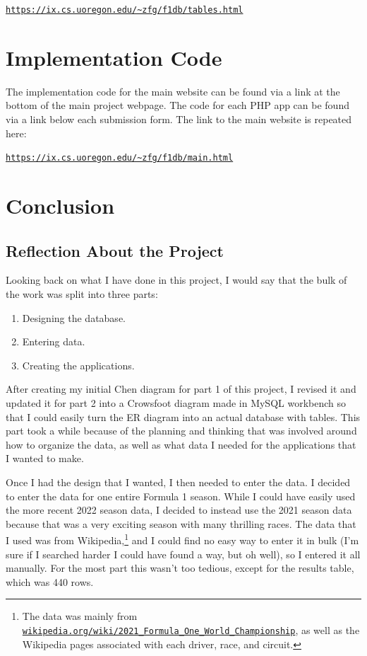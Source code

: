\documentclass{article} %
\begin{document}
\noindent
\href{https://ix.cs.uoregon.edu/~zfg/f1db/tables.html}{\texttt{https://ix.cs.uoregon.edu/\~{}zfg/f1db/tables.html}}

\section{Implementation Code}

The implementation code for the main website can be found via a link at
the bottom of the main project webpage. The code for each PHP app can be
found via a link below each submission form. The link to the main
website is repeated here:

\noindent
\href{https://ix.cs.uoregon.edu/~zfg/f1db/main.html}{\texttt{https://ix.cs.uoregon.edu/\~{}zfg/f1db/main.html}}


\section{Conclusion}

\subsection{Reflection About the Project}

Looking back on what I have done in this project, I would say that the
bulk of the work was split into three parts:
\begin{enumerate}[label=(\arabic*)]
    \item Designing the database.
    \item Entering data.
    \item Creating the applications.
\end{enumerate}

After creating my initial Chen diagram for part 1 of this project, I
revised it and updated it for part 2 into a Crowsfoot diagram made in
MySQL workbench so that I could easily turn the ER diagram into an
actual database with tables. This part took a while because of the
planning and thinking that was involved around how to organize the data,
as well as what data I needed for the applications that I wanted to
make.
\medskip

Once I had the design that I wanted, I then needed to enter the data. I
decided to enter the data for one entire Formula 1 season. While I could
have easily used the more recent 2022 season data, I decided to instead
use the 2021 season data because that was a very exciting season with
many thrilling races. The data that I used was from
Wikipedia,\footnote{The data was mainly from 
\href{https://en.wikipedia.org/wiki/2021_Formula_One_World_Championship}
{\texttt{wikipedia.org/wiki/2021\_Formula\_One\_World\_Championship}},
as well as the Wikipedia pages associated with each driver, race, and
circuit.} and I could find no easy way to enter it in bulk (I'm sure if
I searched harder I could have found a way, but oh well), so I entered
it all manually. For the most part this wasn't too tedious, except for
the results table, which was 440 rows.
\medskip
\end{document}
